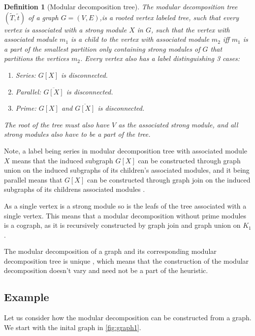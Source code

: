 \documentclass[a4paper]{article}
\newtheorem{definition}{Definition}[section]
\newcommand{\T}{\widetilde{T}}
\renewcommand{\t}{\widetilde{t}}
\begin{document}
\begin{definition}[Modular decomposition tree]{\cite{HCL}}
    The modular decomposition tree $(\T,\t)$ of a graph $G = (V,E)$,is a rooted
    vertex labeled tree, such that every vertex is associated with a strong
    module $X$ in $G$, such that the vertex with associated module $m_1$ is a
    child to the vertex with associated module $m_2$ iff $m_1$ is a part of the
    smallest partition only containing strong modules of $G$ that partitions the
    vertices $m_2$. Every vertex also has a label distinguishing 3 cases:
    \begin{enumerate}
        \item Series: $G[X]$ is disconnected.
        \item Parallel: $\overline{G[X]}$ is disconnected.
        \item Prime: $G[X]$ and $\overline{G[X]}$ is disconnected.
    \end{enumerate}
    The root of the tree must also have $V$ as the associated strong module, and all 
    strong modules also have to be a part of the tree.
\end{definition}

Note, a label being series in modular decomposition tree with associated module
$X$ means that the induced subgraph $G[X]$ can be constructed through graph
union on the induced subgraphs of its children's associated modules, and it being
parallel means that $G[X]$ can be constructed through graph join on the
induced subgraphs of its childrens associated modules \cite{HCL}.

As a single vertex is a strong module so is the leafs of the tree associated
with a single vertex. This means that a modular decomposition without
prime modules is a cograph, as it is recursively constructed by graph join and
graph union on $K_1$.

The modular decomposition of a graph and its corresponding modular
decomposition tree is unique \cite{MDUnique}, which means that the construction
of the modular decomposition doesn't vary and need not be a part of
the heuristic.


\subsection{Example}

Let us consider how the modular decomposition can be constructed from a graph. 
We start with the inital graph in \autoref{fig:graph1}.
\end{document}

